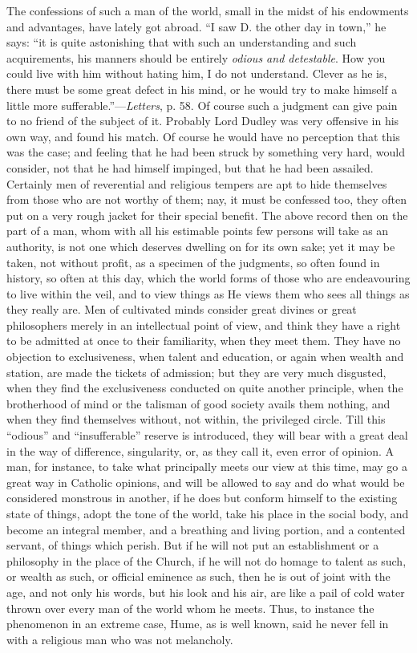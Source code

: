The confessions of such a man of the world, small
in the midst of his endowments and advantages, have lately got
abroad. ``I saw D. the other day in town,'' he says: ``it is quite
astonishing that with such an understanding and such acquirements, his
manners should be entirely \emph{odious and detestable}. How you could
live with him without hating him, I do not understand. Clever as he
is, there must be some great defect in his mind, or he would try to
make himself a little more sufferable.''—\emph{Letters}, p. 58. Of
course such a judgment can give pain to no friend of the subject of
it. Probably Lord Dudley was very offensive in his own way, and found
his match. Of course he would have no perception that this was the
case; and feeling that he had been struck by something very hard,
would consider, not that he had himself impinged, but that he had been
assailed. Certainly men of reverential and religious tempers are apt
to hide themselves from those who are not worthy of them; nay, it must
be confessed too, they often put on a very rough jacket for their
special benefit. The above record then on the part of a man, whom with
all his estimable points few persons will take as an authority, is not
one which deserves dwelling on for its own sake; yet it may be taken,
not without profit, as a specimen of the judgments, so often found in
history, so often at this day, which the world forms of those who are
endeavouring to live within the veil, and to view things as He views
them who sees all things as they really are. Men of cultivated minds
consider great divines or great philosophers merely in an intellectual
point of view, and think they have a right to be admitted at once to
their familiarity, when they meet them. They have no objection to
exclusiveness, when talent and education, or again when wealth and
station, are made the tickets of admission; but they are very much
disgusted, when they find the exclusiveness conducted on quite another
principle, when the brotherhood of mind or the talisman of good
society avails them nothing, and when they find themselves without,
not within, the privileged circle. Till this ``odious'' and ``insufferable''
reserve is introduced, they will bear with a great deal in the way of
difference, singularity, or, as they call it, even error of opinion. A
man, for instance, to take what principally meets our view at this
time, may go a great way in Catholic opinions, and will be allowed to
say and do what would be considered monstrous in another, if he does
but conform himself to the existing state of things, adopt the tone of
the world, take his place in the social body, and become an integral
member, and a breathing and living portion, and a contented servant,
of things which perish. But if he will not put an establishment or a
philosophy in the place of the Church, if he will not do homage to
talent as such, or wealth as such, or official eminence as such, then
he is out of joint with the age, and not only his words, but his look
and his air, are like a pail of cold water thrown over every man of
the world whom he meets. Thus, to instance the phenomenon in an
extreme case, Hume, as is well known, said he never fell in with a
religious man who was not melancholy.

